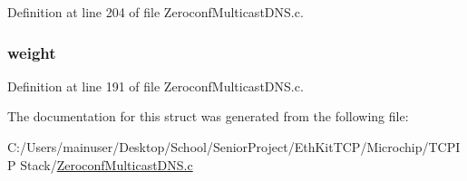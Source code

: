 Definition at line 204 of file Zeroconf\+Multicast\+D\+N\+S.\+c.

\hypertarget{struct__m_d_n_s_resource_record_a57cc215796b6e6ba53c773e1dc2f1932}{}
\subsubsection[{weight}]{ weight}\label{struct__m_d_n_s_resource_record_a57cc215796b6e6ba53c773e1dc2f1932}


Definition at line 191 of file Zeroconf\+Multicast\+D\+N\+S.\+c.



The documentation for this struct was generated from the following file\+:\begin{DoxyCompactItemize}
\item 
C\+:/\+Users/mainuser/\+Desktop/\+School/\+Senior\+Project/\+Eth\+Kit\+T\+C\+P/\+Microchip/\+T\+C\+P\+I\+P Stack/\hyperlink{_zeroconf_multicast_d_n_s_8c}{Zeroconf\+Multicast\+D\+N\+S.\+c}\end{DoxyCompactItemize}
